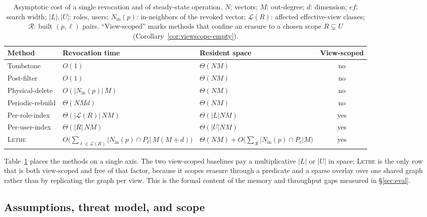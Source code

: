 \documentclass[sigconf, nonacm, review]{acmart}
\newcommand{\Nin}{N_{\mathrm{in}}}
\begin{document}
\begin{table}[t]
\centering
\caption{Asymptotic cost of a single revocation and of steady-state operation.
$N$: vectors; $M$: out-degree; $d$: dimension; $\mathit{ef}$: search width;
$|L|,|U|$: roles, users; $\Nin(p)$: in-neighbors of the revoked vector;
$\mathcal{L}(R)$: affected effective-view classes; $\mathcal{R}$: built
$(p,\ell)$ pairs. ``View-scoped'' marks methods that confine an erasure to a
chosen scope $R\subsetneq U$ (Corollary~\ref{cor:viewscope-empty}).}
\label{tab:asymp-cost}
\footnotesize
\begin{tabular}{@{}lllc@{}}
\toprule
Method & Revocation time & Resident space & View-scoped \\
\midrule
Tombstone        & $O(1)$                 & $\Theta(NM)$              & no  \\
Post-filter      & $O(1)$                 & $\Theta(NM)$              & no  \\
Physical-delete  & $O(|\Nin(p)|\,M)$      & $\Theta(NM)$              & no  \\
Periodic-rebuild & $\Theta(NMd)$          & $\Theta(NM)$              & no  \\
Per-role-index   & $\Theta(|\mathcal{L}(R)|\,NM)$ & $\Theta(|L|NM)$   & yes \\
Per-user-index   & $\Theta(|R|\,NM)$      & $\Theta(|U|NM)$           & yes \\
\textsc{Lethe}   & $O\!\big(\sum_{\ell\in\mathcal{L}(R)}|\Nin(p)\cap P_\ell|\,M(M{+}d)\big)$
                 & $\Theta(NM)+O\!\big(\sum_{\mathcal{R}}|\Nin(p)\cap P_\ell|M\big)$
                 & yes \\
\bottomrule
\end{tabular}
\end{table}

Table~\ref{tab:asymp-cost} places the methods on a single axis. The two
view-scoped baselines pay a multiplicative $|L|$ or $|U|$ in space;
\textsc{Lethe} is the only row that is both view-scoped and free of that factor,
because it scopes erasure through a predicate and a sparse overlay over one
shared graph rather than by replicating the graph per view. This is the formal
content of the memory and throughput gaps measured in \S\ref{sec:eval}.

\subsection{Assumptions, threat model, and scope}
\label{app:scope}
\end{document}

